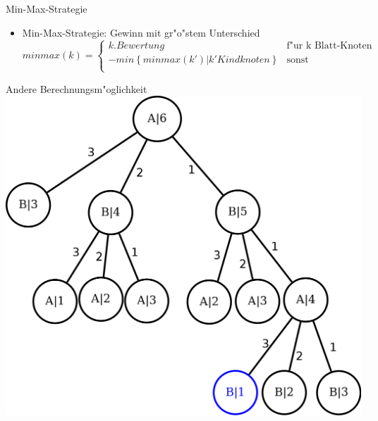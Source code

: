 \documentclass[18pt]{beamer}
\begin{document}
\begin{frame}{Min-Max-Strategie}
\begin{itemize}
\item Min-Max-Strategie: Gewinn mit gr"o"stem Unterschied
\begin{equation}
   minmax(k) =
   \begin{cases}
     k.Bewertung & \text{f"ur k Blatt-Knoten} \\
     - min\left\{minmax(k') | k' Kindknoten\right\} & \text{sonst} \\
   \end{cases}
\end{equation}
\end{itemize}
\end{frame}

\begin{frame}{Andere Berechnungsm"oglichkeit}
\includegraphics[scale=0.55]{baum10.png}
\end{frame}
\end{document}

